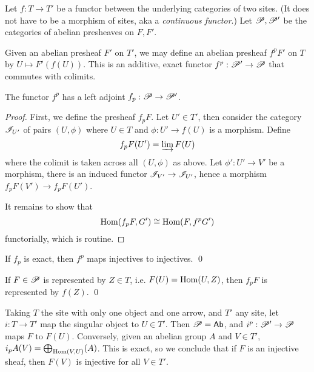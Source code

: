 \documentclass[11pt]{amsart}
\begin{document}
Let $f: T\to T'$ be a functor between the underlying categories of two sites. (It does not have to be a morphism of sites, aka a \emph{continuous functor}.) Let $\mathscr{P}, \mathscr{P}'$ be the categories of abelian presheaves on $F, F'$.

\begin{defn}
    Given an abelian presheaf $F'$ on $T'$, we may define an abelian presheaf $f^pF'$ on $T$ by $U\mapsto F'(f(U))$. This is an additive, exact functor $f^p: \mathscr{P}'\to \mathscr{P}$ that commutes with colimits.
\end{defn}

\begin{prop}
    The functor $f^p$ has a left adjoint $f_p: \mathscr{P}\to \mathscr{P}'$.
\end{prop}

\begin{proof}
    First, we define the presheaf $f_pF$. Let $U'\in T'$, then consider the category $\mathscr{I}_{U'}$ of pairs $(U, \phi)$ where $U\in T$ and $\phi:U'\to f(U)$ is a morphism. Define
    \[f_pF(U') = \varinjlim F(U)\]
    where the colimit is taken across all $(U, \phi)$ as above. Let $\phi':U'\to V'$ be a morphism, there is an induced functor $\mathscr{I}_{V'}\to \mathscr{I}_{U'}$, hence a morphism $f_pF(V')\to f_pF(U')$.

    It remains to show that
    \[\operatorname{Hom}(f_pF, G') \cong \operatorname{Hom}(F, f^pG')\]
    functorially, which is routine.
\end{proof}

\begin{cor}
\label{map_injective_to_injective}
    If $f_p$ is exact, then $f^p$ maps injectives to injectives. \qed
\end{cor}

\begin{cor}
\label{represent_fp}
    If $F\in \mathscr{P}$ is represented by $Z\in T$, i.e. $F(U) = \operatorname{Hom}(U, Z)$, then $f_pF$ is represented by $f(Z)$. \qed
\end{cor}

\begin{exm}
    Taking $T$ the site with only one object and one arrow, and $T'$ any site, let $i:T\to T'$ map the singular object to $U\in T'$. Then $\mathscr{P} = \mathsf{Ab}$, and $i^p: \mathscr{P}' \to \mathscr{P}$ maps $F$ to $F(U)$. Conversely, given an abelian group $A$ and $V\in T'$, $i_pA(V) = \bigoplus_{\operatorname{Hom}(V,U)}(A)$. This is exact, so we conclude that if $F$ is an injective sheaf, then $F(V)$ is injective for all $V\in T'$. 
\end{exm}
\end{document}
